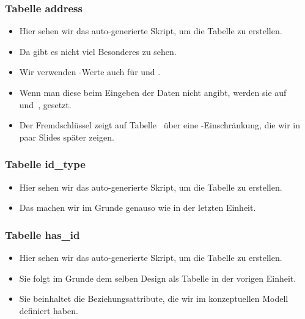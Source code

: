 \documentclass[aspectratio=169,mathserif,notheorems]{beamer}%
\begin{document}
\begin{frame}[t]%
\frametitle{Tabelle address}%
\parbox{0.435\linewidth}{\small%
\begin{itemize}%
%
\item Hier sehen wir das auto-generierte Skript, um die Tabelle  zu erstellen.%
%
\item<2-> Da gibt es nicht viel Besonderes zu sehen.%
%
\item<3-> Wir verwenden -Werte auch für  und .%
%
\item<4-> Wenn man diese beim Eingeben der Daten nicht angibt, werden sie auf~ und~, gesetzt.%
%
\item<5-> Der Fremdschlüssel  zeigt auf Tabelle~ über eine -Einschränkung, die wir in paar Slides später zeigen.%
%
\end{itemize}%
}%
%
\end{frame}%
%
\begin{frame}[t]%
\frametitle{Tabelle id\_type}%
\parbox{0.435\linewidth}{\small%
\begin{itemize}%
%
\item Hier sehen wir das auto-generierte Skript, um die Tabelle  zu erstellen.%
%
\item<2-> Das machen wir im Grunde genauso wie in der letzten Einheit.%
%
\end{itemize}%
}%
%
%
\end{frame}%
%
\begin{frame}[t]%
\frametitle{Tabelle has\_id}%
\parbox{0.435\linewidth}{\small%
\begin{itemize}%
%
\item Hier sehen wir das auto-generierte Skript, um die Tabelle  zu erstellen.%
%
\item<2-> Sie folgt im Grunde dem selben Design als Tabelle  in der vorigen Einheit.%
%
\item<3-> Sie beinhaltet die Beziehungsattribute, die wir im konzeptuellen Modell definiert haben.%
%
\end{itemize}%
}%
%
\end{frame}%
\end{document}
